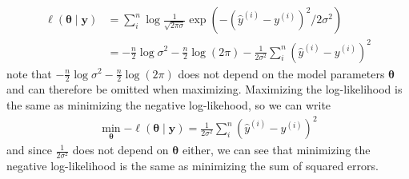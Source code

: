 \begin{equation*}
\begin{split}
        \ell(\boldsymbol{\theta}\mid \boldsymbol{y})&=\sum_i^n\log\frac{1}{\sqrt{2\pi\sigma}}\exp\left(-(\hat{y}^{(i)}-y^{(i)})^2/2\sigma^2\right)\\
        &=-\frac{n}{2} \log \sigma^{2}-\frac{n}{2} \log (2 \pi)-\frac{1}{2 \sigma^{2}} \sum_{i}^n\left(\hat{y}^{(i)}-y^{(i)}\right)^{2}
\end{split}
\end{equation*}
note that $-\frac{n}{2} \log \sigma^{2}-\frac{n}{2} \log (2 \pi)$ does not depend on the model parameters $\boldsymbol{\theta}$ and can therefore be omitted when maximizing. Maximizing the log-likelihood is the same as minimizing the negative log-likehood, so we can write 
\begin{equation*}
\begin{split}
        \min_{\boldsymbol{\theta}}{-\ell(\boldsymbol{\theta}\mid \boldsymbol{y})}=\frac{1}{2 \sigma^{2}} \sum_{i}^n\left(\hat{y}^{(i)}-y^{(i)}\right)^{2}
\end{split}
\end{equation*}
and since $\frac{1}{2 \sigma^{2}}$ does not depend on $\boldsymbol{\theta}$ either, we can see that minimizing the negative log-likelihood is the same as minimizing the sum of squared errors. 



